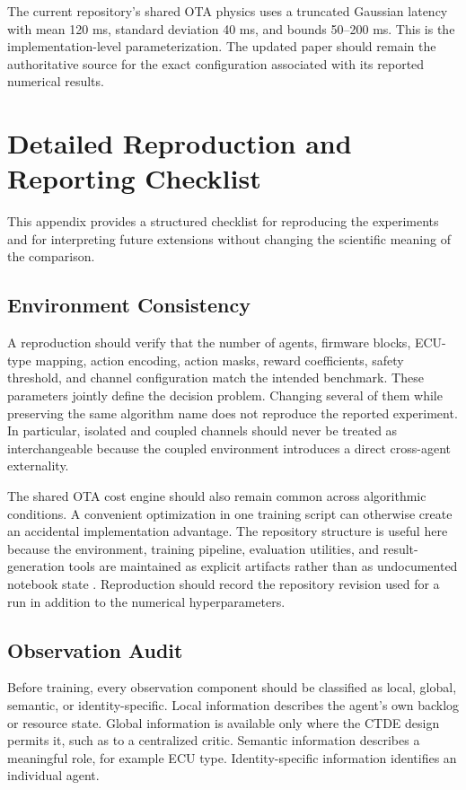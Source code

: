 \documentclass{iutbscthesis}
\begin{document}
\begin{appendices}
The current repository's shared OTA physics uses a truncated Gaussian latency with mean 120 ms, standard deviation 40 ms, and bounds 50--200 ms. This is the implementation-level parameterization. The updated paper should remain the authoritative source for the exact configuration associated with its reported numerical results.


\chapter{Detailed Reproduction and Reporting Checklist}
This appendix provides a structured checklist for reproducing the experiments and for interpreting future extensions without changing the scientific meaning of the comparison.

\section{Environment Consistency}
A reproduction should verify that the number of agents, firmware blocks, ECU-type mapping, action encoding, action masks, reward coefficients, safety threshold, and channel configuration match the intended benchmark. These parameters jointly define the decision problem. Changing several of them while preserving the same algorithm name does not reproduce the reported experiment. In particular, isolated and coupled channels should never be treated as interchangeable because the coupled environment introduces a direct cross-agent externality.

The shared OTA cost engine should also remain common across algorithmic conditions. A convenient optimization in one training script can otherwise create an accidental implementation advantage. The repository structure is useful here because the environment, training pipeline, evaluation utilities, and result-generation tools are maintained as explicit artifacts rather than as undocumented notebook state \parencite{ma_reles_ota_repo}. Reproduction should record the repository revision used for a run in addition to the numerical hyperparameters.

\section{Observation Audit}
Before training, every observation component should be classified as local, global, semantic, or identity-specific. Local information describes the agent's own backlog or resource state. Global information is available only where the CTDE design permits it, such as to a centralized critic. Semantic information describes a meaningful role, for example ECU type. Identity-specific information identifies an individual agent.


\end{appendices}
\end{document}
